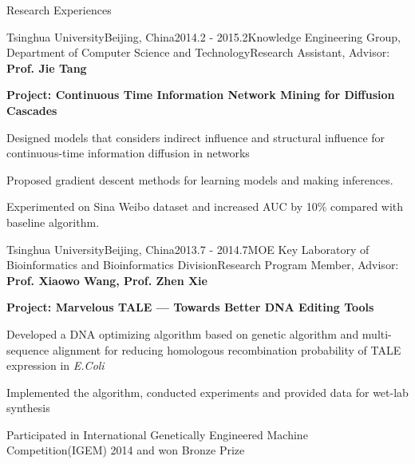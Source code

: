 \documentclass{resume} %
\begin{document}
\begin{rSection}{Research Experiences}
\begin{rSubsection}{Tsinghua University}{Beijing, China}{2014.2 - 2015.2}{Knowledge Engineering Group, Department of Computer Science and Technology}{Research Assistant, Advisor: {\bf Prof. Jie Tang}}
\setlength\itemsep{-.6em}
\item[] {\bf Project: Continuous Time Information Network Mining for Diffusion Cascades}
\item Designed models that considers indirect influence and structural influence for continuous-time information diffusion in networks 
\item Proposed gradient descent methods for learning models and making inferences. 
\item Experimented on Sina Weibo dataset and increased AUC by 10\% compared with baseline algorithm. 
\end{rSubsection}



\begin{rSubsection}{Tsinghua University}{Beijing, China}{2013.7 - 2014.7}{MOE Key Laboratory of Bioinformatics and Bioinformatics Division}{Research Program Member, Advisor: {\bf Prof. Xiaowo Wang, Prof. Zhen Xie}}
\setlength\itemsep{-.6em}
    \item[] {\bf Project:  Marvelous TALE --- Towards Better DNA Editing Tools}
	\item Developed a DNA optimizing algorithm based on genetic algorithm and multi-sequence alignment for reducing homologous recombination probability of TALE expression in {\it E.Coli}
	\item Implemented the algorithm, conducted experiments and provided data for wet-lab synthesis
	\item Participated in International Genetically Engineered Machine Competition(IGEM) 2014 and won Bronze Prize
\end{rSubsection}





\end{rSection}
\end{document}
